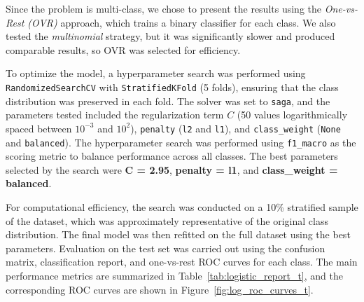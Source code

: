 Since the problem is multi-class, we chose to present the results using the 
\textit{One-vs-Rest (OVR)} approach, which trains a binary classifier for each class. 
We also tested the \textit{multinomial} strategy, but it was significantly slower and 
produced comparable results, so OVR was selected for efficiency.

To optimize the model, a hyperparameter search was performed using 
\texttt{RandomizedSearchCV} with \texttt{StratifiedKFold} (5 folds), ensuring that the class 
distribution was preserved in each fold. The solver was set to \texttt{saga}, and the 
parameters tested included the regularization term $C$ (50 values logarithmically spaced 
between $10^{-3}$ and $10^2$), \texttt{penalty} (\texttt{l2} and \texttt{l1}), and 
\texttt{class\_weight} (\texttt{None} and \texttt{balanced}). The hyperparameter 
search was performed using \texttt{f1\_macro} as the scoring metric to balance 
performance across all classes. The best parameters selected by the search were 
\textbf{C = 2.95}, \textbf{penalty = l1}, and \textbf{class\_weight = balanced}.

For computational efficiency, the search was conducted on a 10\% stratified sample 
of the dataset, which was approximately representative of the original class distribution. The final 
model was then refitted on the full dataset using the best parameters. Evaluation on 
the test set was carried out using the confusion matrix, classification report, and 
one-vs-rest ROC curves for each class. The main performance metrics are summarized in 
Table~\ref{tab:logistic_report_t}, and the corresponding ROC curves are shown in 
Figure~\ref{fig:log_roc_curves_t}. 

